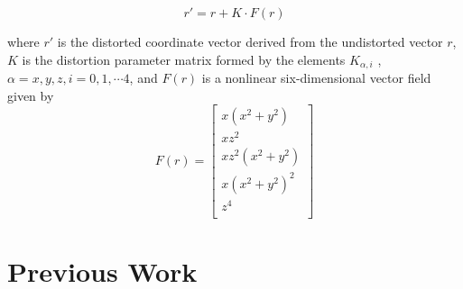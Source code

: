 \begin{equation}
  r' = r + K \cdot F(r)
\end{equation}

where $r'$ is the distorted coordinate vector derived from the undistorted vector $r$, $K$ is the distortion parameter matrix formed by the elements $K_{α,i}$ , $\alpha = x, y, z, i = 0,1,\cdots 4$, and $F(r)$ is a nonlinear six-dimensional vector field given by
\begin{equation}
  F(r) = 
  \begin{bmatrix}
    x(x^2 + y^2) \\
    xz^2 \\
    xz^2(x^2 + y^2) \\
    x(x^2 + y^2)^2 \\
    z^4 \\
  \end{bmatrix} 
\end{equation}

\section{Previous Work}



    
